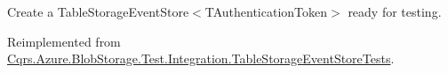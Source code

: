Create a Table\+Storage\+Event\+Store$<$\+T\+Authentication\+Token$>$ ready for testing. 



Reimplemented from \hyperlink{classCqrs_1_1Azure_1_1BlobStorage_1_1Test_1_1Integration_1_1TableStorageEventStoreTests_a287cbdff5908dd04c1924f359986d269_a287cbdff5908dd04c1924f359986d269}{Cqrs.\+Azure.\+Blob\+Storage.\+Test.\+Integration.\+Table\+Storage\+Event\+Store\+Tests}.


